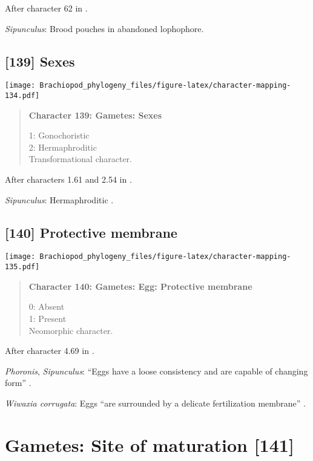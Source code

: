 \documentclass[openany]{book}
\theoremstyle{definition}
\theoremstyle{definition}
\theoremstyle{definition}
\theoremstyle{remark}
\begin{document}
After character 62 in \citet{Haszprunar2000}.

\hypertarget{Sipunculus-coding-138}{}
\emph{Sipunculus}: Brood pouches in abandoned lophophore.

\subsection*{{[}139{]} Sexes}\label{sexes}

\texttt{[image: Brachiopod\_phylogeny\_files/figure-latex/character-mapping-134.pdf]}

\begin{quote}
\textbf{Character 139: Gametes: Sexes}

1: Gonochoristic\\
2: Hermaphroditic\\
Transformational character.
\end{quote}

After characters 1.61 and 2.54 in \citet{SPS1996}.

\hypertarget{Sipunculus-coding-139}{}
\emph{Sipunculus}: Hermaphroditic \citep{Reed1988}.

\subsection*{{[}140{]} Protective membrane}\label{protective-membrane}

\texttt{[image: Brachiopod\_phylogeny\_files/figure-latex/character-mapping-135.pdf]}

\begin{quote}
\textbf{Character 140: Gametes: Egg: Protective membrane}

0: Absent\\
1: Present\\
Neomorphic character.
\end{quote}

After character 4.69 in \citet{SPS1996}.

\hypertarget{Phoronis-coding-140}{}
\emph{Phoronis}, \emph{Sipunculus}: ``Eggs have a loose consistency and
are capable of changing form'' \citep{Franzen1977}.

\hypertarget{Wiwaxia_corrugata-coding-140}{}
\emph{Wiwaxia corrugata}: Eggs ``are surrounded by a delicate
fertilization membrane'' \citep{Pennerstorfer2012}.

\section{Gametes: Site of maturation
{[}141{]}}\label{gametes-site-of-maturation-141}
\end{document}
